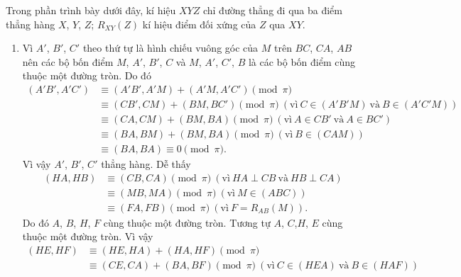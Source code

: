 \begin{bt}
{\begin{bode}
\begin{center}
			\end{center}
			Trong phần trình bày dưới đây, kí hiệu $XYZ$ chỉ đường thẳng đi qua ba điểm thẳng hàng $X$, $Y$, $Z$; $R_{XY}(Z)$ kí hiệu điểm đối xứng của $Z$ qua $XY$.
			\begin{enumerate}
				\item Vì $A'$, $B'$, $C'$ theo thứ tự là hình chiếu vuông góc của $M$ trên $BC$, $CA$, $AB$ nên các bộ bốn điểm $M$, $A'$, $B'$, $C$ và $M$, $A'$, $C'$, $B$ là các bộ bốn điểm cùng thuộc một đường tròn. Do đó
				{\allowdisplaybreaks
					\begin{align*}
					\left( A'B', A'C' \right) &\equiv \left( A'B', A'M \right) +\left( A'M, A'C' \right) \pmod{\pi}\\
					&\equiv \left( CB', CM \right) +\left( BM, BC' \right)\pmod{\pi}\ (\text{vì}\ C\in \left( A'B'M \right)\ \text{và}\ B\in \left( A'C'M \right))\\
					&\equiv (CA,CM) +(BM,BA) \pmod{\pi}\ (\text{vì}\ A\in CB'\ \text{và}\ A\in BC')\\
					&\equiv \left( BA,BM \right) +(BM,BA)\pmod{\pi}\ (\text{vì}\ B\in (CAM))\\
					&\equiv (BA,BA)\equiv 0 \pmod{\pi}.
					\end{align*}
				}
				Vì vậy $A'$, $B'$, $C'$ thẳng hàng. Dễ thấy
				{
					\allowdisplaybreaks
					\begin{align*}
					(HA,HB)&\equiv (CB,CA) \pmod{\pi}\ (\text{vì}\ HA\perp CB\ \text{và}\ HB\perp CA)\\
					&\equiv (MB,MA) \pmod{\pi}\ (\text{vì}\ M\in (ABC))\\
					&\equiv (FA,FB) \pmod{\pi}\ (\text{vì}\ F=R_{AB}(M)).
					\end{align*}
				}
				Do đó $A$, $B$, $H$, $F$ cùng thuộc một đường tròn. Tương tự $A$, $C$,$H$, $E$ cùng thuộc một đường tròn. Vì vậy
				{
					\allowdisplaybreaks
					\begin{align*}
					(HE,HF)&\equiv(HE,HA)+(HA,HF)\pmod{\pi}\\
					&\equiv (CE,CA) +(BA,BF) \pmod{\pi}\ (\text{vì}\ C\in (HEA)\ \text{và}\ B\in (HAF))\\

\end{align*}}
\end{enumerate}
\end{bode}}
\end{bt}
